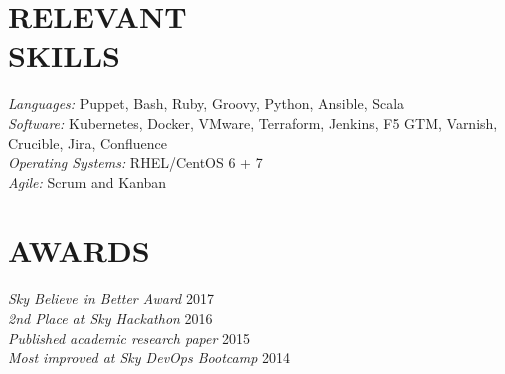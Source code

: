 \documentclass[margin]{res}
\begin{document}
\begin{resume}
\section{RELEVANT \\ SKILLS}
	{\sl Languages:} Puppet, Bash, Ruby, Groovy, Python, Ansible, Scala \\
	{\sl Software:} Kubernetes, Docker, VMware, Terraform, Jenkins, F5 GTM,
	Varnish, Crucible, Jira, Confluence \\
        {\sl Operating Systems:} RHEL/CentOS 6 + 7 \\
	{\sl Agile:} Scrum and Kanban
 
\section{AWARDS}
	{\sl Sky Believe in Better Award} \hfill 2017 \\
	{\sl 2nd Place at Sky Hackathon} \hfill 2016 \\
	{\sl Published academic research paper} \hfill 2015 \\
	{\sl Most improved at Sky DevOps Bootcamp} \hfill 2014 \\

\end{resume}
\end{document}
